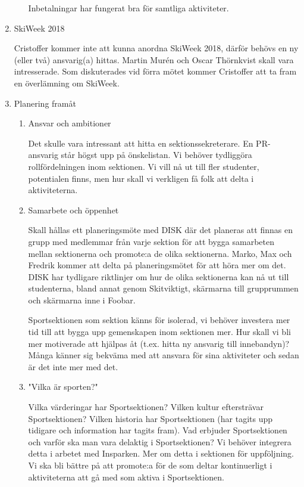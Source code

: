 \documentclass[12pt,a4paper]{article}
\begin{document}
\begin{enumerate}
\begin{enumerate}
				    Inbetalningar har fungerat bra för samtliga aktiviteter.   
				    
			\end{enumerate}
			
		\item SkiWeek 2018
			
			Cristoffer kommer inte att kunna anordna SkiWeek 2018, därför behövs en ny (eller två) ansvarig(a) hittas. Martin Murén och Oscar Thörnkvist skall vara intresserade. Som diskuterades vid förra mötet kommer Cristoffer att ta fram en överlämning om SkiWeek.
			
		\item Planering framåt
		    
		    \begin{enumerate}
				
				\item Ansvar och ambitioner
				    
				    Det skulle vara intressant att hitta en sektionssekreterare. En PR-ansvarig står högst upp på önskelistan. Vi behöver tydliggöra rollfördelningen inom sektionen. Vi vill nå ut till fler studenter, potentialen finns, men hur skall vi verkligen få folk att delta i aktiviteterna. 
				    
				\item Samarbete och öppenhet
				    
				    Skall hållas ett planeringsmöte med DISK där det planeras att finnas en grupp med medlemmar från varje sektion för att bygga samarbeten mellan sektionerna och promote:a de olika sektionerna. Marko, Max och Fredrik kommer att delta på planeringsmötet för att höra mer om det. DISK har tydligare riktlinjer om hur de olika sektionerna kan nå ut till studenterna, bland annat genom Skitviktigt, skärmarna till grupprummen och skärmarna inne i Foobar.
				    
				    Sportsektionen som sektion känns för isolerad, vi behöver investera mer tid till att bygga upp gemenskapen inom sektionen mer. Hur skall vi bli mer motiverade att hjälpas åt (t.ex. hitta ny ansvarig till innebandyn)? Många känner sig bekväma med att ansvara för sina aktiviteter och sedan är det inte mer med det.
				    
				\item "Vilka är sporten?"
				    
				    Vilka värderingar har Sportsektionen? Vilken kultur eftersträvar Sportsektionen? Vilken historia har Sportsektionen (har tagits upp tidigare och information har tagits fram). Vad erbjuder Sportsektionen och varför ska man vara delaktig i Sportsektionen? Vi behöver integrera detta i arbetet med Insparken. Mer om detta i sektionen för uppföljning. Vi ska bli bättre på att promote:a för de som deltar kontinuerligt i aktiviteterna att gå med som aktiva i Sportsektionen.
				    

\end{enumerate}
\end{enumerate}
\end{document}
